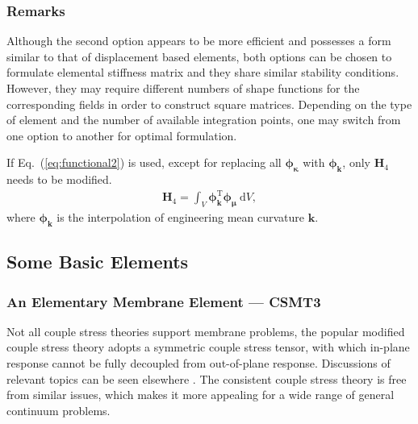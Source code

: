 \documentclass[3p,sort&compress,11pt,fleqn]{elsarticle}
\newcommand*{\eqsref}[1]{Eq.~(\ref{#1})}
\newcommand*{\mT}{\mathrm{T}}
\newcommand*{\md}[1]{\mathrm{d}#1}
\begin{document}
\subsubsection{Remarks}
Although the second option appears to be more efficient and possesses a form similar to that of displacement based elements, both options can be chosen to formulate elemental stiffness matrix and they share similar stability conditions. However, they may require different numbers of shape functions for the corresponding fields in order to construct square matrices. Depending on the type of element and the number of available integration points, one may switch from one option to another for optimal formulation.

If \eqsref{eq:functional2} is used, except for replacing all $\mathbold{\phi}_\mathbold{\kappa}$ with $\mathbold{\phi}_\mathbold{k}$, only $\mathbold{H}_4$ needs to be modified.
\begin{gather}
\mathbold{H}_4=\int_V\mathbold{\phi}_\mathbold{k}^\mT\mathbold{\phi}_\mathbold{\mu}~\md{V},
\end{gather}
where $\mathbold{\phi}_\mathbold{k}$ is the interpolation of engineering mean curvature $\mathbold{k}$.
\subsection{Some Basic Elements}
\subsubsection{An Elementary Membrane Element --- CSMT3}
Not all couple stress theories support membrane problems, the popular modified couple stress theory \citep{Yang2002} adopts a symmetric couple stress tensor, with which in-plane response cannot be fully decoupled from out-of-plane response. Discussions of relevant topics can be seen elsewhere \citep{Hadjesfandiari2016}. The consistent couple stress theory is free from similar issues, which makes it more appealing for a wide range of general continuum problems.
\end{document}

